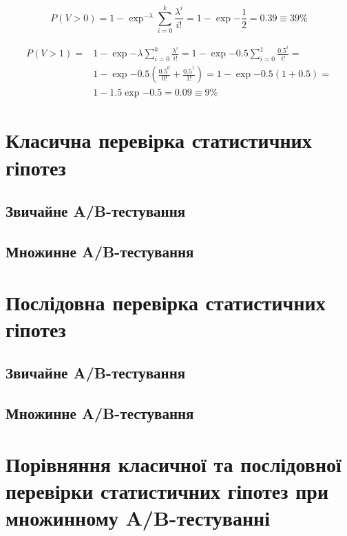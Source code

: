 \documentclass[a4paper,12pt]{article}
\begin{document}
\begin{equation*}
P(V>0)=1-\exp^{-\lambda}\sum_{i=0}^{k}\frac{\lambda^i}{i!} =
1-\exp{-\frac{1}{2}} = 0.39 \equiv 39\%
\end{equation*}

\begin{equation*}
	\begin{aligned}	
		P(V>1)=&1-\exp{-\lambda}\sum_{i=0}^{k}\frac{\lambda^i}{i!} =
		1-\exp{-0.5}\sum_{i=0}^{1}\frac{0.5^i}{i!} =\\
		&1-\exp{-0.5}\left(\frac{0.5^0}{0!}+\frac{0.5^1}{1!}\right) = 
		1-\exp{-0.5}\left(1+0.5\right) = \\
		&1-1.5\exp{-0.5} = 0.09 \equiv 9\%
	\end{aligned}
\end{equation*}

\section{Класична перевірка статистичних гіпотез}
\subsection{Звичайне A/B-тестування}
\subsection{Множинне A/B-тестування}

\section{Послідовна перевірка статистичних гіпотез}
\subsection{Звичайне A/B-тестування}
\subsection{Множинне A/B-тестування}

\section{Порівняння класичної та послідовної перевірки статистичних гіпотез при множинному A/B-тестуванні}



\nocite{*}
\printbibliography[heading=subbibliography,filter=papers,title={Литература}]%
\end{document}
